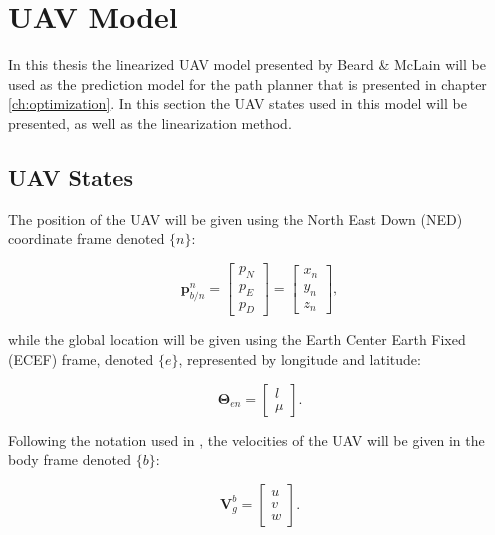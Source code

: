\section{UAV Model}
\label{sec:model}

In this thesis the linearized UAV model presented by Beard \& McLain \cite{uavBEARD} will be used as the prediction model for the path planner that is presented in chapter \ref{ch:optimization}. In this section the UAV states used in this model will be presented, as well as the linearization method.

\subsection{UAV States}
The position of the UAV will be given using the North East Down (NED) coordinate frame denoted $\{n\}$:

\begin{equation}
	\mathbf{p}_{b/n}^n =
	\begin{bmatrix}
		p_N \\ p_E \\ p_D
	\end{bmatrix}
	=
	\begin{bmatrix}
		x_n \\ y_n \\ z_n
	\end{bmatrix},
\end{equation}

while the global location will be given using the Earth Center Earth Fixed (ECEF) frame, denoted $\{e\}$, represented by longitude and latitude:

\begin{equation}
	\bm{\Theta}_{en} =
	\begin{bmatrix}
		l \\ \mu
	\end{bmatrix}.
\end{equation} 

Following the notation used in \cite{uavBEARD}, the velocities of the UAV will be given in the body frame denoted $\{b\}$:

\begin{equation}
	\mathbf{V}^b_g =
	\begin{bmatrix}
		u \\ v \\ w
	\end{bmatrix}.
\end{equation}

